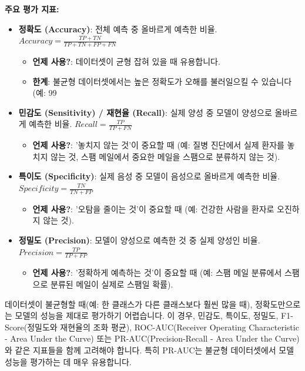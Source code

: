 \documentclass[11pt,a4paper]{article}
\theoremstyle{definition}
\begin{document}
\textbf{주요 평가 지표:}
\begin{itemize}
    \item \textbf{정확도 (Accuracy)}: 전체 예측 중 올바르게 예측한 비율.
    $Accuracy = \frac{TP + TN}{TP + TN + FP + FN}$
    \begin{itemize}
        \item \textbf{언제 사용?}: 데이터셋이 균형 잡혀 있을 때 유용합니다.
        \item \textbf{한계}: 불균형 데이터셋에서는 높은 정확도가 오해를 불러일으킬 수 있습니다 (예: 99%
    \end{itemize}

    \item \textbf{민감도 (Sensitivity) / 재현율 (Recall)}: 실제 양성 중 모델이 양성으로 올바르게 예측한 비율.
    $Recall = \frac{TP}{TP + FN}$
    \begin{itemize}
        \item \textbf{언제 사용?}: '놓치지 않는 것'이 중요할 때 (예: 질병 진단에서 실제 환자를 놓치지 않는 것, 스팸 메일에서 중요한 메일을 스팸으로 분류하지 않는 것).
    \end{itemize}

    \item \textbf{특이도 (Specificity)}: 실제 음성 중 모델이 음성으로 올바르게 예측한 비율.
    $Specificity = \frac{TN}{TN + FP}$
    \begin{itemize}
        \item \textbf{언제 사용?}: '오탐을 줄이는 것'이 중요할 때 (예: 건강한 사람을 환자로 오진하지 않는 것).
    \end{itemize}

    \item \textbf{정밀도 (Precision)}: 모델이 양성으로 예측한 것 중 실제 양성인 비율.
    $Precision = \frac{TP}{TP + FP}$
    \begin{itemize}
        \item \textbf{언제 사용?}: '정확하게 예측하는 것'이 중요할 때 (예: 스팸 메일 분류에서 스팸으로 분류된 메일이 실제로 스팸일 확률).
    \end{itemize}
\end{itemize}

\begin{warningbox}[title={불균형 데이터셋과 평가 지표}]
데이터셋이 불균형할 때(예: 한 클래스가 다른 클래스보다 훨씬 많을 때), 정확도만으로는 모델의 성능을 제대로 평가하기 어렵습니다. 이 경우, 민감도, 특이도, 정밀도, F1-Score(정밀도와 재현율의 조화 평균), ROC-AUC(Receiver Operating Characteristic - Area Under the Curve) 또는 PR-AUC(Precision-Recall - Area Under the Curve)와 같은 지표들을 함께 고려해야 합니다. 특히 PR-AUC는 불균형 데이터셋에서 모델 성능을 평가하는 데 매우 유용합니다.
\end{warningbox}
\end{document}

